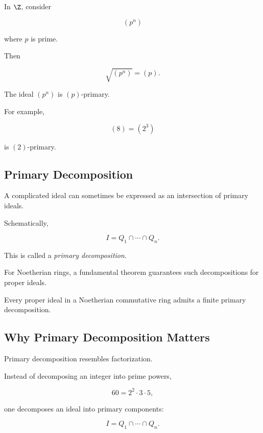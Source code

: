 In \(\Z\), consider

\[ (p^n) \]

where \(p\) is prime.

Then

\[ \sqrt{(p^n)}=(p). \]

The ideal \((p^n)\) is \((p)\)-primary.

For example,

\[ (8)=(2^3) \]

is \((2)\)-primary.

\subsection{Primary Decomposition}
\label{subsec:primary-decomposition}

A complicated ideal can sometimes be expressed as an intersection of
primary ideals.

Schematically,

\[ I=Q_1\cap\cdots\cap Q_n. \]

This is called a \emph{primary decomposition}.

For Noetherian rings, a fundamental theorem guarantees such decompositions
for proper ideals.

\begin{theorem}
Every proper ideal in a Noetherian commutative ring admits a finite primary
decomposition.
\end{theorem}

\subsection{Why Primary Decomposition Matters}
\label{subsec:why-primary-decomposition}

Primary decomposition resembles factorization.

Instead of decomposing an integer into prime powers,

\[ 60=2^2\cdot3\cdot5, \]

one decomposes an ideal into primary components:

\[ I=Q_1\cap\cdots\cap Q_n. \]

\begin{center}
\end{center}

